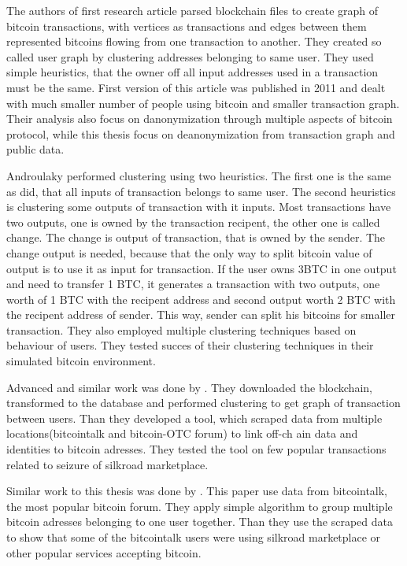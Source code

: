 \documentclass[
  digital, %
  table,   %
  lof,     %
  lot,     %
  oneside
]{fithesis3}
\begin{document}
The authors of first research article \parencite{reid2013analysis}
 parsed blockchain files to create graph of bitcoin transactions, with vertices as transactions
 and edges between them represented bitcoins flowing from one transaction to another.
 They created so called user graph by clustering addresses belonging to same user.
 They used simple heuristics, that the owner off all input addresses used
 in a transaction must be the same. First version of this article  
was published in 2011 and dealt with much smaller number of people using bitcoin and smaller transaction graph.
Their analysis also focus on danonymization through multiple aspects of bitcoin protocol,
while this thesis focus on deanonymization from transaction graph and public data.

Androulaky \parencite{androulaki2013evaluating} performed clustering using two heuristics.
The first one is the same as \parencite{reid2013analysis} did, that all inputs of transaction
belongs to same user. The second heuristics is clustering some outputs of transaction with it inputs.
Most transactions have two outputs, one is owned by the transaction recipent,
the other one is called change. The change is output of transaction, that is owned by
the sender. The change output is needed, because that the only way to split
 bitcoin value of output is to use it as input for transaction.
 If the user owns 3BTC in one output and need to transfer 1 BTC, it generates a transaction
 with two outputs, one worth of 1 BTC with the recipent address and second output worth 2 BTC 
 with the recipent address of sender. This way, sender can split his bitcoins for smaller transaction.
 They also employed multiple clustering techniques based on behaviour of users.
 They tested succes of their clustering techniques in their simulated bitcoin 
 environment.

Advanced and similar work was done by \parencite{spagnuolo2014bitiodine}. They downloaded the blockchain, transformed to
 the database
and performed clustering to get graph of transaction between users.
Than they developed a tool, which scraped data from multiple locations(bitcointalk and bitcoin-OTC forum) to link off-ch
ain data and identities to bitcoin adresses.
They tested the tool on few popular transactions related to seizure of silkroad marketplace.

Similar work to this thesis was done by \parencite{fleder2015bitcoin}.
This paper use data from bitcointalk, the most popular bitcoin forum. 
They apply simple algorithm to group multiple bitcoin adresses belonging to one user together.
Than they use the scraped data to show
that some of the bitcointalk users were using silkroad marketplace or other popular services accepting bitcoin.
 
\end{document}
